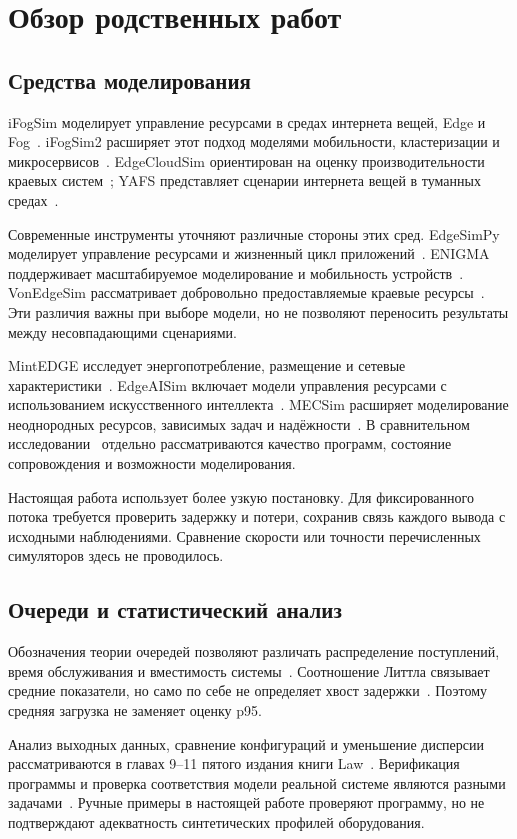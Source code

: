 \documentclass{psta}
\begin{document}
\section{Обзор родственных работ}\label{sec:related}
\subsection{Средства моделирования}
iFogSim моделирует управление ресурсами в средах интернета вещей, Edge и Fog~\cite{ifogsim}. iFogSim2 расширяет этот подход моделями мобильности, кластеризации и микросервисов~\cite{ifogsim2}. EdgeCloudSim ориентирован на оценку производительности краевых систем~\cite{edgecloudsim}; YAFS представляет сценарии интернета вещей в туманных средах~\cite{yafs}.

Современные инструменты уточняют различные стороны этих сред. EdgeSimPy моделирует управление ресурсами и жизненный цикл приложений~\cite{edgesimpy}. ENIGMA поддерживает масштабируемое моделирование и мобильность устройств~\cite{enigma}. VonEdgeSim рассматривает добровольно предоставляемые краевые ресурсы~\cite{vonedge}. Эти различия важны при выборе модели, но не позволяют переносить результаты между несовпадающими сценариями.

MintEDGE исследует энергопотребление, размещение и сетевые характеристики~\cite{mintedge}. EdgeAISim включает модели управления ресурсами с использованием искусственного интеллекта~\cite{edgeaisim}. MECSim расширяет моделирование неоднородных ресурсов, зависимых задач и надёжности~\cite{mecsim}. В сравнительном исследовании~\cite{quality} отдельно рассматриваются качество программ, состояние сопровождения и возможности моделирования.

Настоящая работа использует более узкую постановку. Для фиксированного потока требуется проверить задержку и потери, сохранив связь каждого вывода с исходными наблюдениями. Сравнение скорости или точности перечисленных симуляторов здесь не проводилось.

\subsection{Очереди и статистический анализ}
Обозначения теории очередей позволяют различать распределение поступлений, время обслуживания и вместимость системы~\cite{kendall}. Соотношение Литтла связывает средние показатели, но само по себе не определяет хвост задержки~\cite{little}. Поэтому средняя загрузка не заменяет оценку p95.

Анализ выходных данных, сравнение конфигураций и уменьшение дисперсии рассматриваются в главах 9--11 пятого издания книги Law~\cite{law}. Верификация программы и проверка соответствия модели реальной системе являются разными задачами~\cite{sargent}. Ручные примеры в настоящей работе проверяют программу, но не подтверждают адекватность синтетических профилей оборудования.
\end{document}
